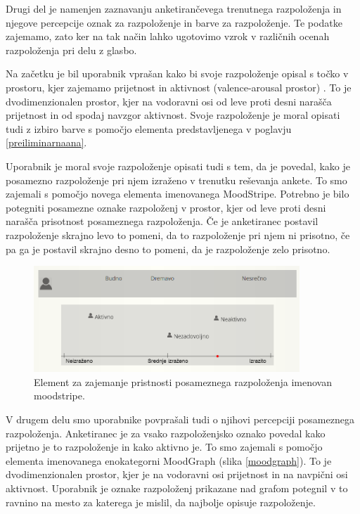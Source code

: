 \documentclass[a4paper, 12pt]{book}
\begin{document}
{Drugi del je namenjen zaznavanju anketirančevega trenutnega razpoloženja in njegove percepcije oznak za razpoloženje in barve za razpoloženje. Te podatke zajemamo, zato ker na tak način lahko ugotovimo vzrok v različnih ocenah razpoloženja pri delu z glasbo. 

Na začetku je bil uporabnik vprašan kako bi svoje razpoloženje opisal s točko v prostoru, kjer zajemamo prijetnost in aktivnost (valence-arousal prostor) \cite{russell1980circumplex}. To je dvodimenzionalen prostor, kjer na vodoravni osi od leve proti desni narašča prijetnost in od spodaj navzgor aktivnost. Svoje razpoloženje je moral opisati tudi z izbiro barve s pomočjo elementa predstavljenega v poglavju \ref{preiliminarnaana}. 

Uporabnik je moral svoje razpoloženje opisati tudi s tem, da je povedal, kako je posamezno razpoloženje pri njem izraženo v trenutku reševanja ankete. To smo zajemali s pomočjo novega elementa imenovanega MoodStripe. Potrebno je bilo potegniti posamezne oznake razpoloženj v prostor, kjer od leve proti desni narašča prisotnost posameznega razpoloženja. Če je anketiranec postavil razpoloženje skrajno levo to pomeni, da to razpoloženje pri njem ni prisotno, če pa ga je postavil skrajno desno to pomeni, da je razpoloženje zelo prisotno.

\begin{figure}[ht]
\centering
\includegraphics[width=10cm]{images/moodstripe.png}

\caption{Element za zajemanje pristnosti posameznega razpoloženja imenovan moodstripe.}
\label{moodstripe}
\end{figure}

V drugem delu smo uporabnike povprašali tudi o njihovi percepciji posameznega razpoloženja. Anketiranec je za vsako razpoloženjsko oznako povedal kako prijetno je to razpoloženje in kako aktivno je. To smo zajemali s pomočjo elementa imenovanega enokategorni MoodGraph (slika \ref{moodgraph}). To je dvodimenzionalen prostor, kjer je na vodoravni osi prijetnost in na navpični osi aktivnost. Uporabnik je oznake razpoloženj prikazane nad grafom potegnil v to ravnino na mesto za katerega je mislil, da najbolje opisuje razpoloženje. 

}
\end{document}
